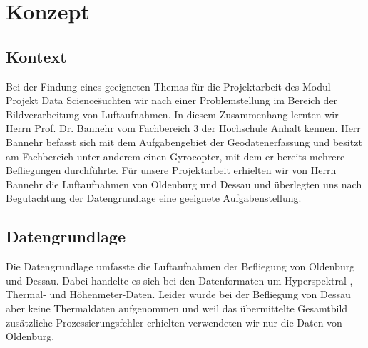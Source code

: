 
\newcommand{\Heading}{Team Gyrcopter}
\newcommand{\Modul}{Projekt Data Science}

\newcommand{\Dozent}{Dozent: Prof. Dr. Christian Hänig}





\chapter{Konzept}\thispagestyle{fancy}

\section{Kontext}

Bei der Findung eines geeigneten Themas für die Projektarbeit des Modul \"Projekt Data Science\" suchten wir
nach einer Problemstellung im Bereich der Bildverarbeitung von Luftaufnahmen.
In diesem Zusammenhang lernten wir Herrn Prof. Dr. Bannehr vom Fachbereich 3 der Hochschule Anhalt kennen.
Herr Bannehr befasst sich mit dem Aufgabengebiet der Geodatenerfassung und besitzt am Fachbereich unter anderem einen
Gyrocopter, mit dem er bereits mehrere Befliegungen durchführte.
Für unsere Projektarbeit erhielten wir von Herrn Bannehr die Luftaufnahmen von Oldenburg und Dessau und überlegten uns
nach Begutachtung der Datengrundlage eine geeignete Aufgabenstellung.

\section{Datengrundlage}
Die Datengrundlage umfasste die Luftaufnahmen der Befliegung von Oldenburg und Dessau.
Dabei handelte es sich bei den Datenformaten um Hyperspektral-, Thermal- und Höhenmeter-Daten.
Leider wurde bei der Befliegung von Dessau aber keine Thermaldaten aufgenommen und weil das übermittelte Gesamtbild
zusätzliche Prozessierungsfehler erhielten verwendeten wir nur die Daten von Oldenburg.

